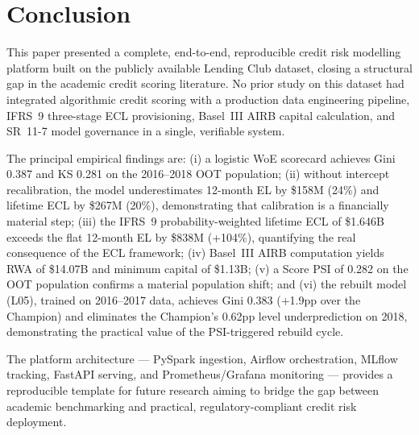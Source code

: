 \documentclass[12pt,a4paper]{report}
\begin{document}
\chapter{Conclusion}
\label{ch:conclusion}

This paper presented a complete, end-to-end, reproducible credit risk modelling platform built on the publicly available Lending Club dataset, closing a structural gap in the academic credit scoring literature. No prior study on this dataset had integrated algorithmic credit scoring with a production data engineering pipeline, IFRS~9 three-stage ECL provisioning, Basel~III AIRB capital calculation, and SR~11-7 model governance in a single, verifiable system.

The principal empirical findings are: (i) a logistic WoE scorecard achieves Gini 0.387 and KS 0.281 on the 2016--2018 OOT population; (ii) without intercept recalibration, the model underestimates 12-month EL by \$158M (24\%) and lifetime ECL by \$267M (20\%), demonstrating that calibration is a financially material step; (iii) the IFRS~9 probability-weighted lifetime ECL of \$1.646B exceeds the flat 12-month EL by \$838M (+104\%), quantifying the real consequence of the ECL framework; (iv) Basel~III AIRB computation yields RWA of \$14.07B and minimum capital of \$1.13B; (v) a Score PSI of 0.282 on the OOT population confirms a material population shift; and (vi) the rebuilt model (L05), trained on 2016--2017 data, achieves Gini 0.383 (+1.9pp over the Champion) and eliminates the Champion's 0.62pp level underprediction on 2018, demonstrating the practical value of the PSI-triggered rebuild cycle.

The platform architecture --- PySpark ingestion, Airflow orchestration, MLflow tracking, FastAPI serving, and Prometheus/Grafana monitoring --- provides a reproducible template for future research aiming to bridge the gap between academic benchmarking and practical, regulatory-compliant credit risk deployment.
\end{document}
